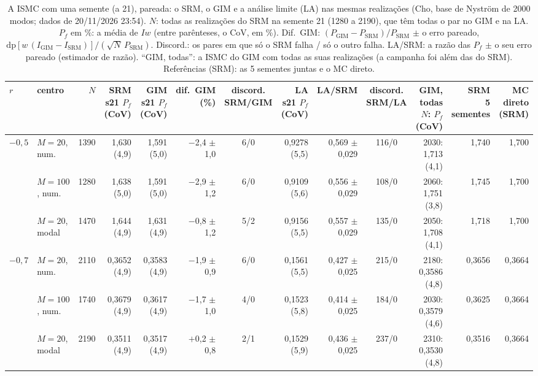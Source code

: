\begin{table}[H]\centering\footnotesize\setlength{\tabcolsep}{3pt}
\caption{A ISMC com uma semente (a 21), pareada: o SRM, o GIM e a análise limite (LA) nas mesmas realizações (Cho, base de Nyström de 2000 modos; dados de 20/11/2026 23:54). $N$: todas as realizações do SRM na semente 21 (1280 a 2190), que têm todas o par no GIM e na LA. $P_f$ em \%: a média de $I w$ (entre parênteses, o CoV, em \%). Dif.\ GIM: $(P_\text{GIM} - P_\text{SRM})/P_\text{SRM}$ $\pm$ o erro pareado, $\mathrm{dp}[w\,(I_\text{GIM} - I_\text{SRM})]/(\sqrt N\,P_\text{SRM})$. Discord.: os pares em que só o SRM falha / só o outro falha. LA/SRM: a razão das $P_f$ $\pm$ o seu erro pareado (estimador de razão). ``GIM, todas'': a ISMC do GIM com todas as suas realizações (a campanha foi além das do SRM). Referências (SRM): as 5 sementes juntas e o MC direto.}\label{tab:sgismc}
\begin{tabular}{llrrrrcrrcrrr}\toprule
$r$ & centro & $N$ & \makecell{SRM s21\\$P_f$ (CoV)} & \makecell{GIM s21\\$P_f$ (CoV)} & \makecell{dif.\ GIM\\(\%)} & \makecell{discord.\\SRM/GIM} & \makecell{LA s21\\$P_f$ (CoV)} & LA/SRM & \makecell{discord.\\SRM/LA} & \makecell{GIM, todas\\$N$: $P_f$ (CoV)} & \makecell{SRM\\5 sementes} & \makecell{MC direto\\(SRM)} \\\midrule
$-0{,}5$ & $M = 20$, num. & 1390 & 1,630 (4,9) & 1,591 (5,0) & $-$2,4 $\pm$ 1,0 & 6/0 & 0,9278 (5,5) & 0,569 $\pm$ 0,029 & 116/0 & 2030: 1,713 (4,1) & 1,740 & 1,700 \\
 & $M = 100$, num. & 1280 & 1,638 (5,0) & 1,591 (5,0) & $-$2,9 $\pm$ 1,2 & 6/0 & 0,9109 (5,6) & 0,556 $\pm$ 0,029 & 108/0 & 2060: 1,751 (3,8) & 1,745 & 1,700 \\
 & $M = 20$, modal & 1470 & 1,644 (4,9) & 1,631 (4,9) & $-$0,8 $\pm$ 1,2 & 5/2 & 0,9156 (5,5) & 0,557 $\pm$ 0,029 & 135/0 & 2050: 1,708 (4,1) & 1,718 & 1,700 \\
\midrule
$-0{,}7$ & $M = 20$, num. & 2110 & 0,3652 (4,9) & 0,3583 (4,9) & $-$1,9 $\pm$ 0,9 & 6/0 & 0,1561 (5,5) & 0,427 $\pm$ 0,025 & 215/0 & 2180: 0,3586 (4,8) & 0,3656 & 0,3664 \\
 & $M = 100$, num. & 1740 & 0,3679 (4,9) & 0,3617 (4,9) & $-$1,7 $\pm$ 1,0 & 4/0 & 0,1523 (5,8) & 0,414 $\pm$ 0,025 & 184/0 & 2030: 0,3579 (4,6) & 0,3625 & 0,3664 \\
 & $M = 20$, modal & 2190 & 0,3511 (4,9) & 0,3517 (4,9) & $+$0,2 $\pm$ 0,8 & 2/1 & 0,1529 (5,9) & 0,436 $\pm$ 0,025 & 237/0 & 2310: 0,3530 (4,8) & 0,3516 & 0,3664 \\
\bottomrule\end{tabular}\end{table}
